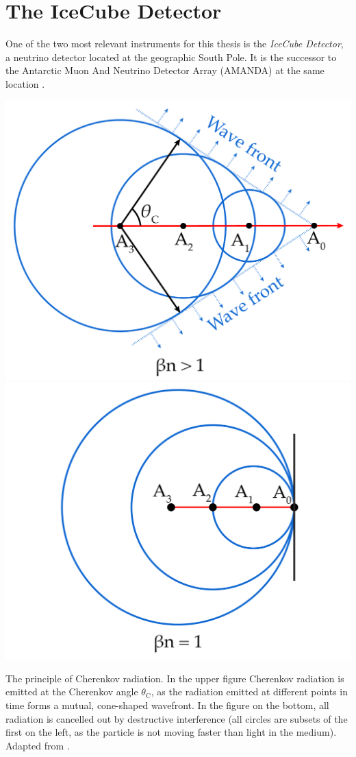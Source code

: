 \documentclass[
    a4paper, %
    fontsize=10pt, %
    twoside=false, %
    numbers=noenddot, %
    fontmethod=tex,
]{kaobook}
\begin{document}
\chapter{The IceCube Detector} \label{ic}
One of the two most relevant instruments for this thesis is the \textit{IceCube Detector}, a neutrino detector located at the geographic South Pole. It is the successor to the Antarctic Muon And Neutrino Detector Array (AMANDA) at the same location .
\begin{marginfigure}
    \includegraphics{ic/ic_cherenkov1.pdf}
    \includegraphics{ic/ic_cherenkov2.pdf}
    \caption[Cherenkov radiation]{The principle of Cherenkov radiation. In the upper figure Cherenkov radiation is emitted at the Cherenkov angle $\theta_\text{C}$, as the radiation emitted at different points in time forms a mutual, cone-shaped wavefront. In the figure on the bottom, all radiation is cancelled out by destructive interference (all circles are subsets of the first on the left, as the particle is not moving faster than light in the medium). Adapted from \cite{LAnnunziata2020}.}
\end{marginfigure}
\end{document}
